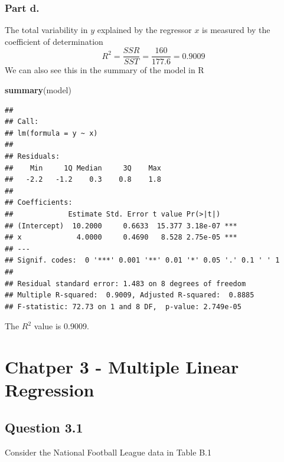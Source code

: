 \documentclass[
  11pt,
]{article}
\newenvironment{Shaded}{\begin{snugshade}}{\end{snugshade}}
\newcommand{\FunctionTok}[1]{\textcolor[rgb]{0.13,0.29,0.53}{\textbf{#1}}}
\newcommand{\NormalTok}[1]{#1}
\begin{document}
\subsubsection{Part d.~}\label{part-d.}

The total variability in \(y\) explained by the regressor \(x\) is
measured by the coefficient of determination
\[R^2 = \frac{SSR}{SST} = \frac{160}{177.6} = 0.9009\] We can also see
this in the summary of the model in R

\begin{Shaded}
\begin{Highlighting}[]
\FunctionTok{summary}\NormalTok{(model)}
\end{Highlighting}
\end{Shaded}

\begin{verbatim}
## 
## Call:
## lm(formula = y ~ x)
## 
## Residuals:
##    Min     1Q Median     3Q    Max 
##   -2.2   -1.2    0.3    0.8    1.8 
## 
## Coefficients:
##             Estimate Std. Error t value Pr(>|t|)    
## (Intercept)  10.2000     0.6633  15.377 3.18e-07 ***
## x             4.0000     0.4690   8.528 2.75e-05 ***
## ---
## Signif. codes:  0 '***' 0.001 '**' 0.01 '*' 0.05 '.' 0.1 ' ' 1
## 
## Residual standard error: 1.483 on 8 degrees of freedom
## Multiple R-squared:  0.9009, Adjusted R-squared:  0.8885 
## F-statistic: 72.73 on 1 and 8 DF,  p-value: 2.749e-05
\end{verbatim}

The \(R^2\) value is 0.9009.

\section{Chatper 3 - Multiple Linear
Regression}\label{chatper-3---multiple-linear-regression}

\subsection{Question 3.1}\label{question-3.1}

Consider the National Football League data in Table B.1
\end{document}
